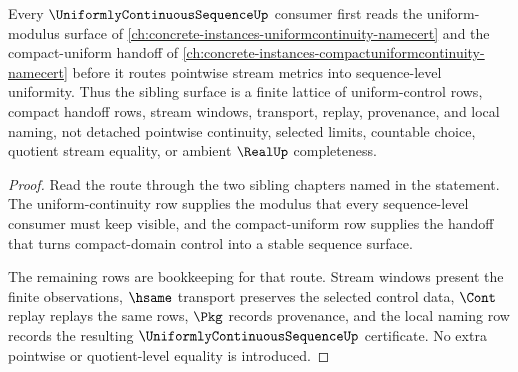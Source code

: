 \begin{theorem}
\label{thm:uniformly-continuous-sequence-sibling-dependency}
Every $\UniformlyContinuousSequenceUp$ consumer first reads the uniform-modulus surface of \autoref{ch:concrete-instances-uniformcontinuity-namecert} and the compact-uniform handoff of \autoref{ch:concrete-instances-compactuniformcontinuity-namecert} before it routes pointwise stream metrics into sequence-level uniformity. Thus the sibling surface is a finite lattice of uniform-control rows, compact handoff rows, stream windows, transport, replay, provenance, and local naming, not detached pointwise continuity, selected limits, countable choice, quotient stream equality, or ambient $\RealUp$ completeness.
\end{theorem}
\begin{proof}
Read the route through the two sibling chapters named in the statement. The uniform-continuity row supplies the modulus that every sequence-level consumer must keep visible, and the compact-uniform row supplies the handoff that turns compact-domain control into a stable sequence surface.

The remaining rows are bookkeeping for that route. Stream windows present the finite observations, $\hsame$ transport preserves the selected control data, $\Cont$ replay replays the same rows, $\Pkg$ records provenance, and the local naming row records the resulting $\UniformlyContinuousSequenceUp$ certificate. No extra pointwise or quotient-level equality is introduced.
\end{proof}
